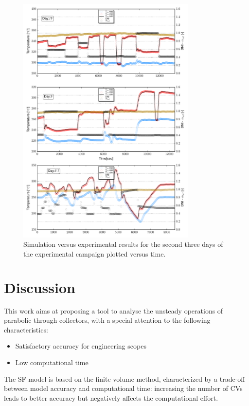 \documentclass[final,3p,times,review]{elsarticle}
\begin{document}
\begin{figure}[h!]
	\centering
	\includegraphics[width=0.8\textwidth]{Figures/_SecondThreeDays.pdf}
	\caption{Simulation versus experimental results for  the second three days of the experimental campaign plotted versus time. }
	\label{fig:SF_ModRes_Second3Days}
\end{figure}
%
\clearpage
%
\section{Discussion} \label{Sec:Disccusion}
%
This work aims at proposing a tool to analyse the unsteady operations of parabolic through collectors, with a special
attention to the following characteristics:
%
\begin{itemize}
	\item Satisfactory accuracy for engineering scopes
	\item Low computational time
\end{itemize}
%
The SF model is based on the finite volume method, characterized by a trade-off between model accuracy and computational time: increasing the number of CVs leads to better accuracy but negatively affects
the computational effort.
\end{document}
